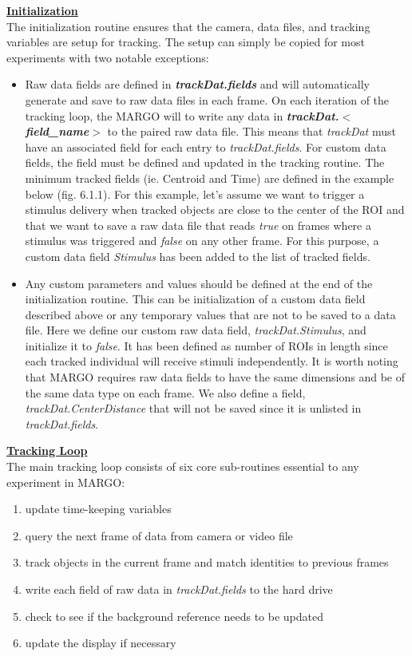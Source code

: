 \documentclass[11pt]{article}
\begin{document}
\newpage
\textbf{\underline{Initialization}}\\
The initialization routine ensures that the camera, data files, and tracking variables are setup for tracking. The setup can simply be copied for most experiments with two notable exceptions:
\begin{itemize}
	\item Raw data fields are defined in \textbf{\textit{trackDat.fields}} and will automatically generate and save to raw data files in each frame. On each iteration of the tracking loop, the MARGO will to write any data in \textbf{\textit{trackDat.$<$field\_name$>$}} to the paired raw data file. This means that \textit{trackDat} must have an associated field for each entry to \textit{trackDat.fields}. For custom data fields, the field must be defined and updated in the tracking routine. The minimum tracked fields (ie. Centroid and Time) are defined in the example below (fig. 6.1.1). For this example, let's assume we want to trigger a stimulus delivery when tracked objects are close to the center of the ROI and that we want to save a raw data file that reads \textit{true} on frames where a stimulus was triggered and \textit{false} on any other frame. For this purpose, a custom data field \textit{Stimulus} has been added to the list of tracked fields. 
	\item Any custom parameters and values should be defined at the end of the initialization routine. This can be initialization of a custom data field described above or any temporary values that are not to be saved to a data file. Here we define our custom raw data field, \textit{trackDat.Stimulus}, and initialize it to \textit{false}. It has been defined as number of ROIs in length since each tracked individual will receive stimuli independently. It is worth noting that MARGO requires raw data fields to have the same dimensions and be of the same data type on each frame. We also define a field, \textit{trackDat.CenterDistance} that will not be saved since it is unlisted in \textit{trackDat.fields}.
\end{itemize}

\textbf{\underline{Tracking Loop}}\vspace*{0.25cm}\\
The main tracking loop consists of six core sub-routines essential to any experiment in MARGO:
\begin{enumerate}
	\itemsep0em
	\item update time-keeping variables
	\item query the next frame of data from camera or video file
	\item track objects in the current frame and match identities to previous frames
	\item write each field of raw data in \textit{trackDat.fields} to the hard drive
	\item check to see if the background reference needs to be updated
	\item update the display if necessary
\end{enumerate} 
\end{document}

